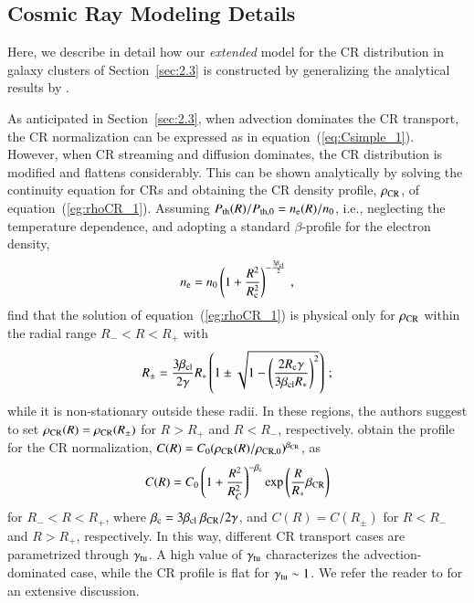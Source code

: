 \documentclass[useAMS,usenatbib]{mn2e}
\begin{document}
\begin{appendix}

\section{Cosmic Ray Modeling Details}
\label{app:B}

Here, we describe in detail how our \emph{extended} model for the CR distribution
in galaxy clusters of Section~\ref{sec:2.3} is constructed by generalizing the
analytical results by \cite{2011A&A...527A..99E}.

As anticipated in Section~\ref{sec:2.3}, when advection dominates the CR
transport, the CR normalization can be expressed as in
equation~(\ref{eq:Csimple_1}). However, when CR streaming and diffusion
dominates, the CR distribution is modified and flattens considerably. This can
be shown analytically by solving the continuity equation for CRs and obtaining
the CR density profile, $\rho_{{\mathrm{CR}}}$, of
equation~(\ref{eg:rhoCR_1}). Assuming $P_{{\mathrm{th}}}(R)/P_{{\mathrm{th}},0}=n_{{\mathrm{e}}}(R)/n_{0}$, i.e.,
neglecting the temperature dependence, and adopting a standard $\beta$-profile
for the electron density,
%
\begin{equation}
n_{{\mathrm{e}}} = n_{0} \left( 1+\frac{R^{2}}{R_{{\mathrm{c}}}^{2}} \right)^{-\frac{3\beta_{{\mathrm{cl}}}}{2}} \, ,
\label{eq:beta_profile}
\end{equation}
% 
\cite{2011A&A...527A..99E} find that the solution of equation~(\ref{eg:rhoCR_1}) is physical only 
for $\rho_{{\mathrm{CR}}}$ within the radial range $R_{-} < R < R_{+}$ with
%
\begin{equation}
R_{\pm} = \frac{3\beta_{{\mathrm{cl}}}}{2\gamma}R_{*}\left(1\pm\sqrt{1-\left(\frac{2R_{{\mathrm{c}}}\gamma}{3\beta_{{\mathrm{cl}}}R_{*}}\right)^{2}}\right) \, ;
\label{eq:Rpm}
\end{equation} 
%
while it is non-stationary outside these radii. In these regions, the authors
suggest to set $\rho_{{\mathrm{CR}}}(R) = \rho_{\rm{CR}}(R_{\pm})$ for $R > R_{+}$
and $R < R_{-}$, respectively. \cite{2011A&A...527A..99E} obtain the profile for
the CR normalization,
$C(R)=C_{0}(\rho_{{\mathrm{CR}}}(R)/\rho_{{\mathrm{CR}},0})^{\beta_{{\mathrm{CR}}}}$, as
%
\begin{equation}
C(R) = C_{0}\left( 1+ \frac{R^{2}}{R_{C}^{2}} \right)^{-\beta_{{\mathrm{c}}}} {\mathrm{exp}}\left( {\frac{R}{R_{*}}\beta_{{\mathrm{CR}}}} \right)
\label{eq:Ctransport}
\end{equation} 
%
for $R_{-}<R<R_{+}$, where
$\beta_{{\mathrm{c}}}=3\beta_{{\mathrm{cl}}}~\beta_{{\mathrm{CR}}}/2\gamma$, and $C(R) =
C(R_{\pm})$ for $R<R_{-}$ and $R>R_{+}$, respectively. In this way, different CR
transport cases are parametrized through $\gamma_{{\mathrm{tu}}}$.  A high value of
$\gamma_{{\mathrm{tu}}}$ characterizes the advection-dominated case, while the CR
profile is flat for $\gamma_{{\mathrm{tu}}} \sim1$. We refer the reader to
\cite{2011A&A...527A..99E} for an extensive discussion.


\end{appendix}
\end{document}
